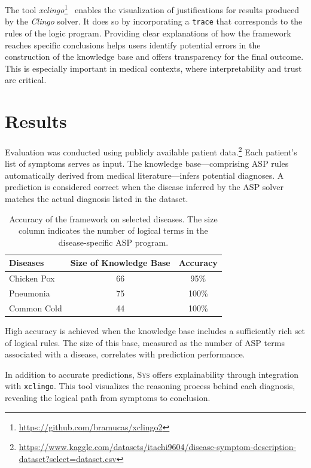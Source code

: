 \documentclass[10pt,leqno]{amsart}
\newcommand{\src}[1]{\texttt{#1}}
\newcommand{\sys}{\textsc{Sys}\xspace}
\begin{document}
The tool \textit{xclingo}\footnote{\url{https://github.com/bramucas/xclingo2}}~\cite{Cabalar_2020} 
enables the visualization of justifications for results produced by the \textit{Clingo} solver. 
It does so by incorporating a \src{trace} that corresponds to the rules of the logic program. 
Providing clear explanations of how the framework reaches specific conclusions helps users identify 
potential errors in the construction of the knowledge base and offers transparency for the final outcome. 
This is especially important in medical contexts, where interpretability and trust are critical.

\section{Results}

Evaluation was conducted using publicly available patient data.\footnote{\url{https://www.kaggle.com/datasets/itachi9604/disease-symptom-description-dataset?select=dataset.csv}}
Each patient's list of symptoms serves as input.  
The knowledge base—comprising ASP rules automatically derived  
from medical literature—infers potential diagnoses.  
A prediction is considered correct when the disease inferred  
by the ASP solver matches the actual diagnosis listed in the dataset.

\begin{table}[h]
    \centering
    \begin{tabular}{lcc}
    \hline
    Diseases & Size of Knowledge Base & Accuracy \\
    \hline
    \hline
    Chicken Pox    &  66  & 95\% \\
    Pneumonia      &  75  & 100\% \\
    Common Cold    &  44  & 100\% \\
    \hline
    \end{tabular}
    \caption{Accuracy of the framework on selected diseases. 
    The size column indicates the number of logical terms in the disease-specific ASP program.}
\end{table}

High accuracy is achieved when the knowledge base includes a sufficiently 
rich set of logical rules. The size of this base, measured as the number 
of ASP terms associated with a disease, correlates with prediction performance.

In addition to accurate predictions, \sys offers explainability 
through integration with \src{xclingo}. 
This tool visualizes the reasoning process behind each diagnosis, 
revealing the logical path from symptoms to conclusion.
\end{document}
